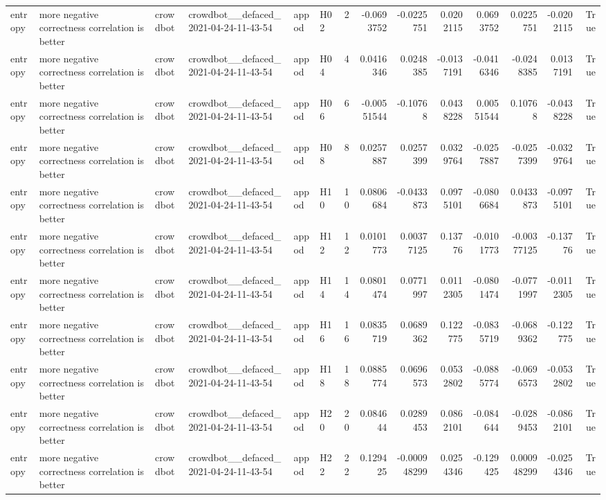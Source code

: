 \begin{longtable}{llllllrrrrrrrr}
entropy & more negative correctness correlation is better & crowdbot & crowdbot\_\_defaced\_2021-04-24-11-43-54 & appod & H02 & 2 & -0.0693752 & -0.0225751 & 0.0202115 & 0.0693752 & 0.0225751 & -0.0202115 & True \\
entropy & more negative correctness correlation is better & crowdbot & crowdbot\_\_defaced\_2021-04-24-11-43-54 & appod & H04 & 4 & 0.0416346 & 0.0248385 & -0.0137191 & -0.0416346 & -0.0248385 & 0.0137191 & True \\
entropy & more negative correctness correlation is better & crowdbot & crowdbot\_\_defaced\_2021-04-24-11-43-54 & appod & H06 & 6 & -0.00551544 & -0.10768 & 0.0438228 & 0.00551544 & 0.10768 & -0.0438228 & True \\
entropy & more negative correctness correlation is better & crowdbot & crowdbot\_\_defaced\_2021-04-24-11-43-54 & appod & H08 & 8 & 0.0257887 & 0.0257399 & 0.0329764 & -0.0257887 & -0.0257399 & -0.0329764 & True \\
entropy & more negative correctness correlation is better & crowdbot & crowdbot\_\_defaced\_2021-04-24-11-43-54 & appod & H10 & 10 & 0.0806684 & -0.0433873 & 0.0975101 & -0.0806684 & 0.0433873 & -0.0975101 & True \\
entropy & more negative correctness correlation is better & crowdbot & crowdbot\_\_defaced\_2021-04-24-11-43-54 & appod & H12 & 12 & 0.0101773 & 0.00377125 & 0.13776 & -0.0101773 & -0.00377125 & -0.13776 & True \\
entropy & more negative correctness correlation is better & crowdbot & crowdbot\_\_defaced\_2021-04-24-11-43-54 & appod & H14 & 14 & 0.0801474 & 0.0771997 & 0.0112305 & -0.0801474 & -0.0771997 & -0.0112305 & True \\
entropy & more negative correctness correlation is better & crowdbot & crowdbot\_\_defaced\_2021-04-24-11-43-54 & appod & H16 & 16 & 0.0835719 & 0.0689362 & 0.122775 & -0.0835719 & -0.0689362 & -0.122775 & True \\
entropy & more negative correctness correlation is better & crowdbot & crowdbot\_\_defaced\_2021-04-24-11-43-54 & appod & H18 & 18 & 0.0885774 & 0.0696573 & 0.0532802 & -0.0885774 & -0.0696573 & -0.0532802 & True \\
entropy & more negative correctness correlation is better & crowdbot & crowdbot\_\_defaced\_2021-04-24-11-43-54 & appod & H20 & 20 & 0.084644 & 0.0289453 & 0.0862101 & -0.084644 & -0.0289453 & -0.0862101 & True \\
entropy & more negative correctness correlation is better & crowdbot & crowdbot\_\_defaced\_2021-04-24-11-43-54 & appod & H22 & 22 & 0.129425 & -0.000948299 & 0.0254346 & -0.129425 & 0.000948299 & -0.0254346 & True \\

\end{longtable}
